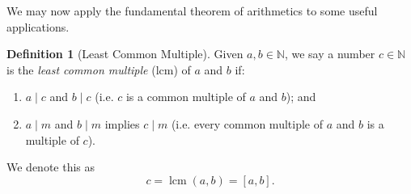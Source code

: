 \documentclass{article}
\theoremstyle{definition}
\newtheorem{definition}[theorem]{Definition}
\theoremstyle{remark}
\newcommand{\pqty}[1]{\left(#1\right)}
\newcommand{\bqty}[1]{\left[#1\right]}
\newcommand{\divides}{\mid}
\newcommand{\lcm}{\operatorname{lcm}}
\newcommand{\NN}{\mathbb{N}}
\begin{document}
We may now apply the fundamental theorem of arithmetics to some useful applications.

\begin{definition}[Least Common Multiple]
    Given \(a, b \in \NN\), we say a number \(c \in \NN\) is the \emph{least common multiple} (lcm) of \(a\) and \(b\) if:
    \begin{enumerate}
        \item \(a \divides c\) and \(b \divides c\) (i.e. \(c\) is a common multiple of \(a\) and \(b\)); and
        \item \(a \divides m\) and \(b \divides m\) implies \(c \divides m\) (i.e. every common multiple of \(a\) and \(b\) is a multiple of \(c\)).
    \end{enumerate}

    We denote this as
    \[
        c = \lcm\pqty{a, b} = \bqty{a, b}.
    \]  
\end{definition}
\end{document}
